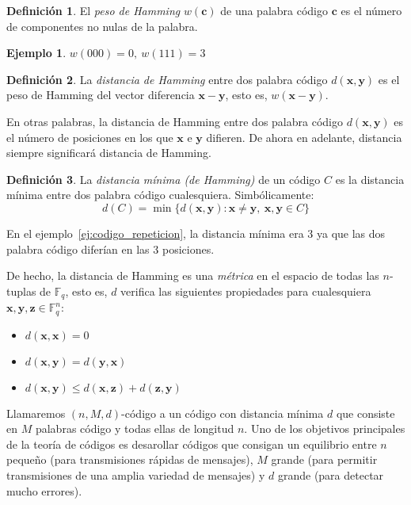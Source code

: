 \documentclass[a4paper,11pt]{article}
\numberwithin{equation}{section}
\theoremstyle{definition} %
\newtheorem{ejemplo}{Ejemplo}[section]
\newtheorem{definicion}{Definición}[section]
\newcommand{\x}{\mathbf{x}}
\newcommand{\y}{\mathbf{y}}
\newcommand{\z}{\mathbf{z}}
\renewcommand{\c}{\mathbf{c}}
\newcommand{\Fq}{\mathbb{F}_q}
\newcommand{\Fqn}{\mathbb{F}_q^n}
\begin{document}
    \begin{definicion}
        El \emph{peso de Hamming} $w(\c)$ de una palabra código $\c$ es el número de componentes no nulas de la palabra.
    \end{definicion}

    \begin{ejemplo}
        $w(000) = 0,\ w(111) = 3$
    \end{ejemplo}

    \begin{definicion}
        La \emph{distancia de Hamming} entre dos palabra código $d(\x, \y)$ es el peso de Hamming del vector diferencia $\x - \y$, esto es, $w(\x - \y)$.

        En otras palabras, la distancia de Hamming entre dos palabra código $d(\x, \y)$ es el número de posiciones en los que $\x$ e $\y$ difieren. De ahora en adelante, distancia siempre significará distancia de Hamming.
    \end{definicion}

    \begin{definicion}
        La \emph{distancia mínima (de Hamming)} de un código $C$ es la distancia mínima entre dos palabra código cualesquiera. Simbólicamente:
        $$ d(C) = \min\{d(\x, \y) : \x \neq \y,\ \x, \y \in C\}$$

        En el ejemplo~\ref{ej:codigo_repeticion}, la distancia mínima era 3 ya que las dos palabra código diferían en las 3 posiciones.
    \end{definicion}

    De hecho, la distancia de Hamming es una \emph{métrica} en el espacio de todas las $n$-tuplas de $\Fq$, esto es, $d$ verifica las siguientes propiedades para cualesquiera $\x, \y, \z \in \Fqn$:
    \begin{itemize}
        \item $d(\x, \x) = 0$
        \item $d(\x, \y) = d(\y, \x)$
        \item $d(\x, \y) \leq d(\x, \z) + d(\z, \y)$
    \end{itemize}

    Llamaremos $(n, M, d)$-código a un código con distancia mínima $d$ que consiste en $M$ palabras código y todas ellas de longitud $n$. Uno de los objetivos principales de la teoría de códigos es desarollar códigos que consigan un equilibrio entre $n$ pequeño (para transmisiones rápidas de mensajes), $M$ grande (para permitir transmisiones de una amplia variedad de mensajes) y $d$ grande (para detectar mucho errores).
\end{document}
